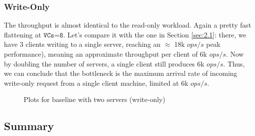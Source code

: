 \documentclass[11pt,a4paper]{article}
\newcommand{\num}[1]{\texttt{#1}}
\begin{document}
\subsubsection*{Write-Only}

The throughput is almost identical to the read-only workload. Again a pretty fast flattening at $\num{VCs=8}$. 
Let's compare it with the one in Section \ref{sec:2.1}: there, we have 3 clients writing to a single server, reaching an $\approx$ 18k $ops/s$ peak performance), meaning an approximate throughput per client of 6k $ops/s$.
Now by doubling the number of servers, a single client still produces 6k $ops/s$. 
Thus, we can conclude that the bottleneck is the maximum arrival rate of incoming write-only request from a single client machine, limited at 6k $ops/s$. 

\newpage

\begin{figure}[!h]
  \centering
  \caption{Plots for baseline with two servers (write-only)}
  \label{fig:baseline_no_mw_2_server_wo}
\end{figure}

\subsection{Summary}
\label{sec:2.3}
\end{document}
